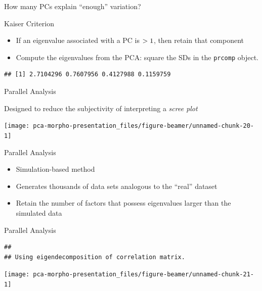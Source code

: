 \documentclass[ignorenonframetext,]{beamer}
\providecommand{\tightlist}{%
  \setlength{\itemsep}{0pt}\setlength{\parskip}{0pt}}
\begin{document}
\begin{frame}[fragile]{How many PCs explain ``enough'' variation?}
\protect\hypertarget{how-many-pcs-explain-enough-variation}{}

\begin{block}{Kaiser Criterion}

\begin{itemize}
\tightlist
\item
  If an eigenvalue associated with a PC is \(\small >1\), then retain
  that component
\item
  Compute the eigenvalues from the PCA: square the SDs in the
  \texttt{prcomp} object.
\end{itemize}

\begin{verbatim}
## [1] 2.7104296 0.7607956 0.4127988 0.1159759
\end{verbatim}

\end{block}

\begin{block}{Parallel Analysis}

Designed to reduce the subjectivity of interpreting a \emph{scree plot}

\texttt{[image: pca-morpho-presentation\_files/figure-beamer/unnamed-chunk-20-1]}

\end{block}

\begin{block}{Parallel Analysis}

\begin{itemize}
\tightlist
\item
  Simulation-based method
\item
  Generates thousands of data sets analogous to the ``real'' dataset
\item
  Retain the number of factors that possess eigenvalues larger than the
  simulated data
\end{itemize}

\end{block}

\begin{block}{Parallel Analysis}

\begin{verbatim}
## 
## Using eigendecomposition of correlation matrix.
\end{verbatim}

\begin{center}\texttt{[image: pca-morpho-presentation\_files/figure-beamer/unnamed-chunk-21-1]} \end{center}

\end{block}

\end{frame}
\end{document}
